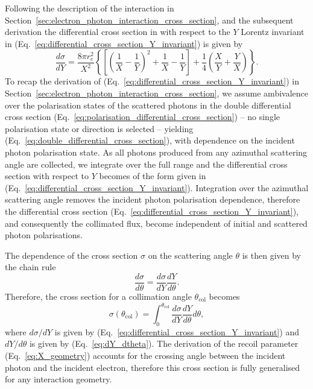 \documentclass[../main.tex]{subfiles}
\begin{document}
Following the description of the interaction in Section~\ref{sec:electron_photon_interaction_cross_section}, and the subsequent derivation the differential cross section in with respect to the $Y$ Lorentz invariant in (Eq.~\ref{eq:differential_cross_section_Y_invariant}) is given by 
\begin{equation*}
\frac{d\sigma}{dY} = \frac{8\pi r_{e}^{2}}{X^{2}}\left\{\left[\left(\frac{1}{X}-\frac{1}{Y}\right)^{2}+\frac{1}{X}-\frac{1}{Y}\right]+\frac{1}{4}\left(\frac{X}{Y}+\frac{Y}{X}\right)\right\}.
\end{equation*}
To recap the derivation of (Eq.~\ref{eq:differential_cross_section_Y_invariant}) in Section~\ref{sec:electron_photon_interaction_cross_section}, we assume ambivalence over the polarisation states of the scattered photons in the double differential cross section (Eq.~\ref{eq:polarisation_differential_cross_section}) -- no single polarisation state or direction is selected -- yielding (Eq.~\ref{eq:double_differential_cross_section}), with dependence on the incident photon polarisation state. As all photons produced from any azimuthal scattering angle are collected, we integrate over the full range and the differential cross section with respect to $Y$ becomes of the form given in (Eq.~\ref{eq:differential_cross_section_Y_invariant}). Integration over the azimuthal scattering angle removes the incident photon polarisation dependence, therefore the differential cross section (Eq.~\ref{eq:differential_cross_section_Y_invariant}), and consequently the collimated flux, become independent of initial and scattered photon polarisations.

The dependence of the cross section $\sigma$ on the scattering angle $\theta$ is then given by the chain rule
\begin{equation}
\frac{d\sigma}{d\theta} = \frac{d\sigma}{dY}\frac{dY}{d\theta}.
\label{eq:cross_section_chain_rule}
\end{equation}
Therefore, the cross section for a collimation angle $\theta_{\mathrm{col}}$ becomes
\begin{equation}
\sigma\left(\theta_{\mathrm{col}}\right) = \int_{0}^{\theta_{\mathrm{col}}}\frac{d\sigma}{dY}\frac{dY}{d\theta}d\theta,
\label{eq:cross_section_integral}
\end{equation} 
where $d\sigma/dY$ is given by (Eq.~\ref{eq:differential_cross_section_Y_invariant}) and $dY/d\theta$ is given by (Eq.~\ref{eq:dY_dtheta}). The derivation of the recoil parameter (Eq.~\ref{eq:X_geometry}) accounts for the crossing angle between the incident photon and the incident electron, therefore this cross section is fully generalised for any interaction geometry.
\end{document}
